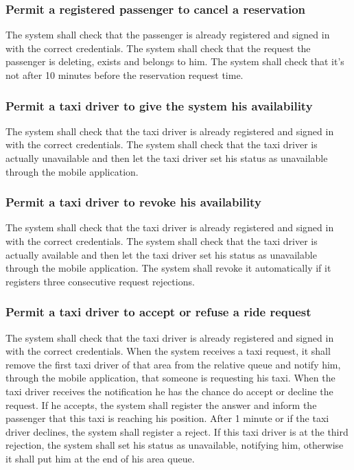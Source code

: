 		\subsubsection{Permit a registered passenger to cancel a reservation}
			The system shall check that the passenger is already registered and signed in with
			the correct	credentials.
			The system shall check that the request the passenger is deleting, exists and belongs
			to him.
			The system shall check that it's not after 10 minutes before the reservation request time.
		\subsubsection{Permit a taxi driver to give the system his availability}
			The system shall check that the taxi driver is already registered and signed in with
			the correct	credentials.
			The system shall check that the taxi driver is actually unavailable and then
			let the taxi driver set his status as unavailable through the mobile application.
		\subsubsection{Permit a taxi driver to revoke his availability}
			The system shall check that the taxi driver is already registered and signed in with
			the correct	credentials.
			The system shall check that the taxi driver is actually available and then
			let the taxi driver set his status as unavailable through the mobile application.
			The system shall revoke it automatically if it registers three consecutive request
			rejections.
		\subsubsection{Permit a taxi driver to accept or refuse a ride request}
			The system shall check that the taxi driver is already registered and signed in with
			the correct	credentials.
			When the system receives a taxi request, it shall remove the first taxi driver
			of that area from the relative queue and notify him, through the mobile application,
			that someone is requesting his taxi.
			When the taxi driver receives the notification he has the chance do accept or decline
			the request. If he accepts, the system shall register the answer and inform the passenger
			that this taxi is reaching his position. After 1 minute or if the taxi driver declines,
			the system shall register a reject.
			If this taxi driver is at the third rejection, the system shall set	his status as unavailable,
			notifying him, otherwise it shall put him at the end of his area queue.
